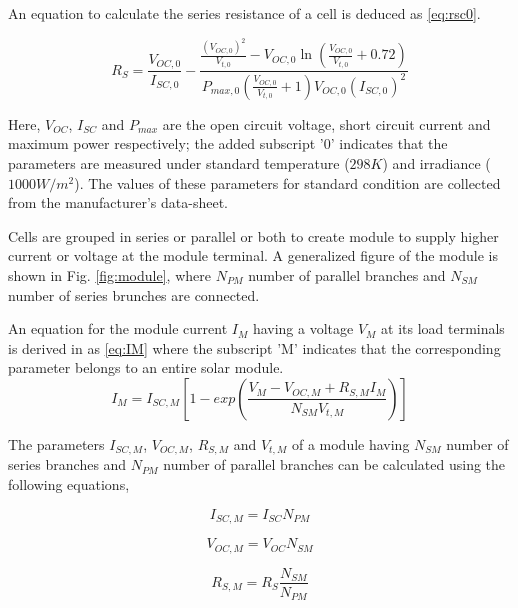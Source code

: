 \documentclass[journal]{IEEEtran/IEEEtran}
\newcommand{\figref}[1]{Fig. \ref{#1}}
\begin{document}
	An equation to calculate the series resistance of a cell is deduced as \eqref{eq:rsc0}. 
	
	\begin{equation}
	\label{eq:rsc0}
	R_S = \frac{V_{OC,0}}{I_{SC,0}}-\frac{\frac{\left(V_{OC,0}\right)^2}{V_{t,0}}-V_{OC,0}\ln\left(\frac{V_{OC,0}}{V_{t,0}}+0.72\right)}{P_{max,0}\left(\frac{V_{OC,0}}{V_{t,0}}+1\right)V_{OC,0}\left(I_{SC,0}\right)^2 } 
	\end{equation}
	
	Here, $V_{OC}$, $I_{SC}$ and $P_{max}$ are the open circuit voltage, short circuit current and maximum power respectively; the added subscript '0' indicates that the parameters are measured under standard temperature ($298K$) and irradiance ($1000 W/m^2$). The values of these parameters for standard condition are collected from the manufacturer's data-sheet.
	
	Cells are grouped in series or parallel or both to create module to supply higher current or voltage at the module terminal. A generalized figure of the module is shown in \figref{fig:module}, where $N_{PM}$ number of parallel branches and $N_{SM}$ number of series brunches are connected. 
	
	An equation for the module current $I_M$ having a voltage $V_M$ at its load terminals is derived in \cite{pvmodel} as \eqref{eq:IM} where the subscript 'M' indicates that the corresponding parameter belongs to an entire solar module.
	\begin{equation}
	\label{eq:IM}
	I_M = I_{SC,M}\left[1-exp\left(\frac{V_M-V_{OC,M}+R_{S,M}I_M}{N_{SM}V_{t,M}}\right)\right] 
	\end{equation}
	
	The parameters $I_{SC,M}$, $V_{OC,M}$, $R_{S,M}$ and $V_{t,M}$ of a module having $N_{SM}$ number of series branches and $N_{PM}$ number of parallel branches can be calculated using the following equations,
	
	\begin{equation}
	\label{eq:iscm}
	I_{SC,M}=I_{SC} N_{PM}
	\end{equation}
	
	\begin{equation}
	\label{eq:vocm}
	V_{OC,M}=V_{OC} N_{SM}
	\end{equation}
	
	\begin{equation}
	\label{eq:rsm}
	R_{S,M}=R_S \frac{N_{SM}}{N_{PM}}
	\end{equation}
	
\end{document}
